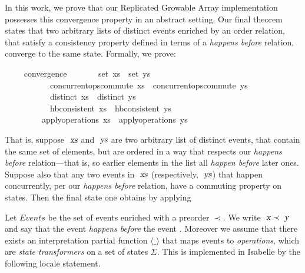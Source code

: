 \documentclass[acmlarge,review,anonymous]{acmart}\settopmatter{printfolios=true}
\begin{document}
In this work, we prove that our Replicated Growable Array implementation possesses this convergence property in an abstract setting.
Our final theorem states that two arbitrary lists of distinct events enriched by an order relation, that satisfy a consistency property defined in terms of a \emph{happens before} relation, converge to the same state.
Formally, we prove:
\\
\begin{isabellebody}
\ \ \ \  convergence{\isacharcolon}\isanewline
\ \ \ \ \ \ \ {\isachardoublequoteopen}set\ xs\ {\isacharequal}\ set\ ys{\isachardoublequoteclose}\isanewline
\ \ \ \ \ \ \ \ \ \ \ {\isachardoublequoteopen}concurrent{\isacharunderscore}ops{\isacharunderscore}commute\ xs{\isachardoublequoteclose}\ \ {\isachardoublequoteopen}concurrent{\isacharunderscore}ops{\isacharunderscore}commute\ ys{\isachardoublequoteclose}\isanewline
\ \ \ \ \ \ \ \ \ \ \ {\isachardoublequoteopen}distinct\ xs{\isachardoublequoteclose}\ \ {\isachardoublequoteopen}distinct\ ys{\isachardoublequoteclose}\isanewline
\ \ \ \ \ \ \ \ \ \ \ {\isachardoublequoteopen}hb{\isacharunderscore}consistent\ xs{\isachardoublequoteclose}\ \ {\isachardoublequoteopen}hb{\isacharunderscore}consistent\ ys{\isachardoublequoteclose}\isanewline
\ \ \ \ \ \ \ \ \ {\isachardoublequoteopen}apply{\isacharunderscore}operations\ xs\ {\isacharequal}\ apply{\isacharunderscore}operations\ ys{\isachardoublequoteclose}\isanewline
\end{isabellebody}
That is, suppose $\isa{xs}$ and $\isa{ys}$ are two arbitrary list of distinct events, that contain the same set of elements, but are ordered in a way that respects our \emph{happens before} relation---that is, so earlier elements in the list all \emph{happen before} later ones.
Suppose also that any two events in $\isa{xs}$ (respectively, $\isa{ys}$) that happen concurrently, per our \emph{happens before} relation, have a commuting property on states.
Then the final state one obtains by applying

Let $\mathit{Events}$ be the set of events enriched with a preorder $\prec$. We
write $\isa{x} \prec \isa{y}$ and say that the event  \emph{happens
before} the event .  Moreover we assume that there exists an
interpretation partial function $\langle\_\rangle$ that maps events to
\emph{operations}, which are \emph{state transformers} on a set of states
$\Sigma$.  This is implemented in Isabelle by the following locale
statement.
\end{document}

